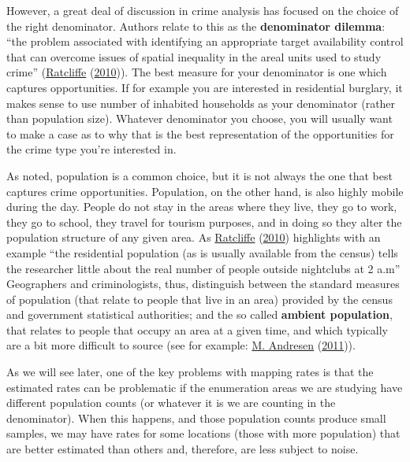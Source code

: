 \documentclass[
  krantz2]{krantz}
\begin{document}
However, a great deal of discussion in crime analysis has focused on the choice of the right denominator. Authors relate to this as the \textbf{denominator dilemma}: ``the problem associated with identifying an appropriate target availability control that can overcome issues of spatial inequality in the areal units used to study crime'' (\protect\hyperlink{ref-Ratcliffe_2010}{Ratcliffe} (\protect\hyperlink{ref-Ratcliffe_2010}{2010})). The best measure for your denominator is one which captures opportunities. If for example you are interested in residential burglary, it makes sense to use number of inhabited households as your denominator (rather than population size). Whatever denominator you choose, you will usually want to make a case as to why that is the best representation of the opportunities for the crime type you're interested in.

As noted, population is a common choice, but it is not always the one that best captures crime opportunities. Population, on the other hand, is also highly mobile during the day. People do not stay in the areas where they live, they go to work, they go to school, they travel for tourism purposes, and in doing so they alter the population structure of any given area. As \protect\hyperlink{ref-Ratcliffe_2010}{Ratcliffe} (\protect\hyperlink{ref-Ratcliffe_2010}{2010}) highlights with an example ``the residential population (as is usually available from the census) tells the researcher little about the real number of people outside nightclubs at 2 a.m'' Geographers and criminologists, thus, distinguish between the standard measures of population (that relate to people that live in an area) provided by the census and government statistical authorities; and the so called \textbf{ambient population}, that relates to people that occupy an area at a given time, and which typically are a bit more difficult to source (see for example: \protect\hyperlink{ref-Andresen_2011}{M. Andresen} (\protect\hyperlink{ref-Andresen_2011}{2011})).

As we will see later, one of the key problems with mapping rates is that the estimated rates can be problematic if the enumeration areas we are studying have different population counts (or whatever it is we are counting in the denominator). When this happens, and those population counts produce small samples, we may have rates for some locations (those with more population) that are better estimated than others and, therefore, are less subject to noise.
\end{document}
